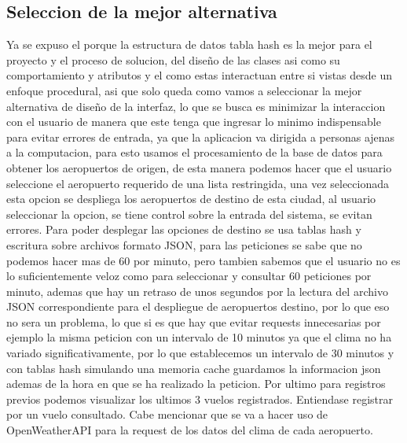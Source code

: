 \documentclass[12pt]{article}
\begin{document}
\subsection{Seleccion de la mejor alternativa}
Ya se expuso el porque la estructura de datos tabla hash es la mejor para el proyecto y el proceso de solucion, del diseño de las clases asi como su comportamiento y atributos y el como estas interactuan entre si vistas desde un enfoque procedural, asi que solo queda como vamos a seleccionar la mejor alternativa de diseño de la interfaz, lo que se busca es minimizar la interaccion con el usuario de manera que este tenga que ingresar lo minimo indispensable para evitar errores de entrada, ya que la aplicacion va dirigida a personas ajenas a la computacion, para esto usamos el procesamiento de la base de datos para obtener los aeropuertos de origen, de esta manera podemos hacer que el usuario seleccione el aeropuerto requerido de una lista restringida, una vez seleccionada esta opcion se despliega los aeropuertos de destino de esta ciudad, al usuario seleccionar la opcion, se tiene control sobre la entrada del sistema, se evitan errores. Para poder desplegar las opciones de destino se usa tablas hash y escritura sobre archivos formato JSON, para las peticiones se sabe que no podemos hacer mas de 60 por minuto, pero tambien sabemos que el usuario no es lo suficientemente veloz como para seleccionar y consultar 60 peticiones por minuto, ademas que hay un retraso de unos segundos por la lectura del archivo JSON correspondiente para el despliegue de aeropuertos destino, por lo que eso no sera un problema, lo que si es que hay que evitar requests innecesarias por ejemplo la misma peticion con un intervalo de 10 minutos ya que el clima no ha variado significativamente, por lo que establecemos un intervalo de 30 minutos y con tablas hash simulando una memoria cache guardamos la informacion json ademas de la hora en que se ha realizado la peticion. Por ultimo para registros previos podemos visualizar los ultimos 3 vuelos registrados. Entiendase registrar por un vuelo consultado. Cabe mencionar que se va a hacer uso de OpenWeatherAPI para la request de los datos del clima de cada aeropuerto.
\end{document}
